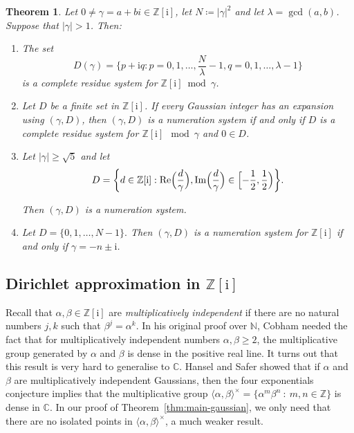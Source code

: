 \documentclass{amsart}
\newcommand{\Z}{\mathbb{Z}}
\newcommand{\ii}{\mathrm{i}}
\newtheorem{theorem}{Theorem}
\newtheorem*{main theorem}{Theorem \ref{thm:main-gaussian}}
\theoremstyle{definition}
\begin{document}
\begin{theorem}\label{thm:numerations-exist}
Let $0\neq \gamma=a+bi\in \Z[\ii]$, let $N\coloneq |\gamma|^2$
and let $\lambda = \gcd(a,b)$.  Suppose  that $|\gamma|>1$. Then:    \begin{enumerate}\item\cite[Theorem 7.4.1]{Lothaire} The set
\[ D(\gamma)=\biggl\{p+\ii q: p= 0,1, \dots , \frac{N}{\lambda} -1, q=0,1, \dots , \lambda -1 \biggr\}\]
is a complete residue system for $\Z[\ii] \bmod \gamma$.
\item\cite[Proposition 7.4.2]{Lothaire} Let $D$ be a finite set in $\Z[\ii]$. If every Gaussian integer has an expansion  using $(\gamma ,D)$, then $(\gamma, D)$ is a numeration system if and only if $D$ is a complete residue system for $\Z[\ii] \mod \gamma$ and $0\in D$.
\item \cite{DDG}  Let $|\gamma|\geq \sqrt{5} $ and let
\[D= \biggl\{d \in \Z[\ii] :  \operatorname{Re}\Bigl(\frac{d}{\gamma}\Bigr),\operatorname{Im}\Bigl(\frac{d}\gamma{}\Bigr)\in \Bigl[-\frac{1}{2}, \frac{1}{2}\Bigr)\biggr\}.\]

Then $(\gamma, D)$ is a numeration system.
\item\cite{Katai-Szabo} Let 
$D=\{0,1, \dots ,N-1\}.$
Then 
$(\gamma, D) $ is a numeration system for $\Z[\ii]$ if and only if $\gamma = -n\pm \ii$. 
\end{enumerate}
\end{theorem}




\subsection{\texorpdfstring{Dirichlet approximation in $\Z[\ii]$}{Dirichlet approximation in Z[\ii ]}}
Recall that $\alpha, \beta\in \mathbb{Z}[\ii]$ are {\em multiplicatively independent} if there are no natural numbers $j,k$ such that $\beta^j= \alpha^k$.
In his original proof over $\mathbb N$, Cobham needed the fact that for multiplicatively independent numbers  $\alpha, \beta\geq 2$,
 the multiplicative group generated by $\alpha$ and $\beta$ is dense in the positive real line. It turns out that this result is very hard to generalise to $\mathbb C$.  Hansel and Safer showed that if $\alpha$ and $\beta$ are multiplicatively independent Gaussians, then the four exponentials conjecture implies that the multiplicative group
 $\langle\alpha,\beta\rangle^\times=\{\alpha^m\beta^n\::\:m,n\in\Z\}$
   is dense in  $\mathbb C$. In our proof of Theorem~\ref{thm:main-gaussian}, we only need that there are no isolated points in  $\langle\alpha,\beta\rangle^\times$, a much weaker result.  
\end{document}
